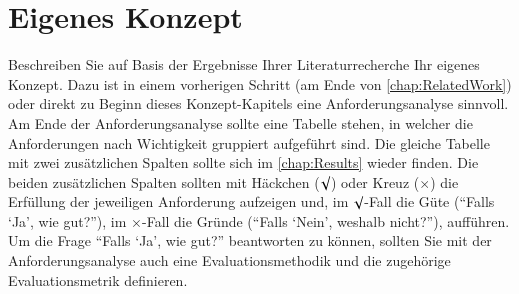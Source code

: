 \chapter{Eigenes Konzept}\label{chap:Concept}
Beschreiben Sie auf Basis der Ergebnisse Ihrer Literaturrecherche Ihr eigenes Konzept. Dazu ist in einem vorherigen Schritt (am Ende von \autoref{chap:RelatedWork}) oder direkt zu Beginn dieses Konzept-Kapitels eine Anforderungsanalyse sinnvoll. Am Ende der Anforderungsanalyse sollte eine Tabelle stehen, in welcher die Anforderungen nach Wichtigkeit gruppiert aufgeführt sind. Die gleiche Tabelle mit zwei zusätzlichen Spalten sollte sich im \autoref{chap:Results} wieder finden. Die beiden zusätzlichen Spalten sollten mit Häckchen ($\surd$) oder Kreuz ($\times$) die Erfüllung der jeweiligen Anforderung aufzeigen und, im $\surd$-Fall die Güte (\enquote{Falls \enquote{Ja}, wie gut?}), im $\times$-Fall die Gründe (\enquote{Falls \enquote{Nein}, weshalb nicht?}), aufführen. Um die Frage \enquote{Falls \enquote{Ja}, wie gut?} beantworten zu können, sollten Sie mit der Anforderungsanalyse auch eine Evaluationsmethodik und die zugehörige Evaluationsmetrik definieren.